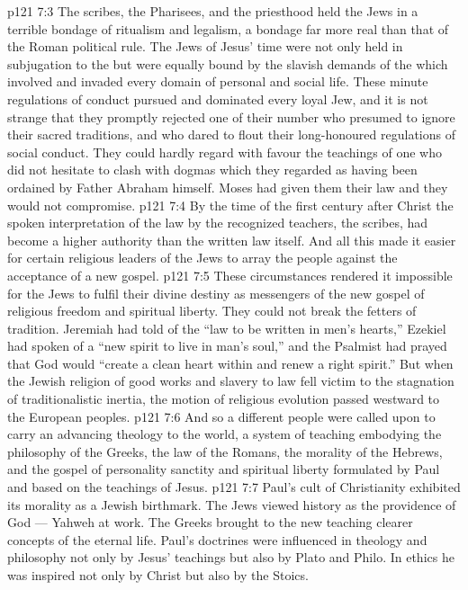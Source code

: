 \vs p121 7:3 The scribes, the Pharisees, and the priesthood held the Jews in a terrible bondage of ritualism and legalism, a bondage far more real than that of the Roman political rule. The Jews of Jesus’ time were not only held in subjugation to the  but were equally bound by the slavish demands of the  which involved and invaded every domain of personal and social life. These minute regulations of conduct pursued and dominated every loyal Jew, and it is not strange that they promptly rejected one of their number who presumed to ignore their sacred traditions, and who dared to flout their long\hyp{}honoured regulations of social conduct. They could hardly regard with favour the teachings of one who did not hesitate to clash with dogmas which they regarded as having been ordained by Father Abraham himself. Moses had given them their law and they would not compromise.
\vs p121 7:4 By the time of the first century after Christ the spoken interpretation of the law by the recognized teachers, the scribes, had become a higher authority than the written law itself. And all this made it easier for certain religious leaders of the Jews to array the people against the acceptance of a new gospel.
\vs p121 7:5 These circumstances rendered it impossible for the Jews to fulfil their divine destiny as messengers of the new gospel of religious freedom and spiritual liberty. They could not break the fetters of tradition. Jeremiah had told of the “law to be written in men’s hearts,” Ezekiel had spoken of a “new spirit to live in man’s soul,” and the Psalmist had prayed that God would “create a clean heart within and renew a right spirit.” But when the Jewish religion of good works and slavery to law fell victim to the stagnation of traditionalistic inertia, the motion of religious evolution passed westward to the European peoples.
\vs p121 7:6 And so a different people were called upon to carry an advancing theology to the world, a system of teaching embodying the philosophy of the Greeks, the law of the Romans, the morality of the Hebrews, and the gospel of personality sanctity and spiritual liberty formulated by Paul and based on the teachings of Jesus.
\vs p121 7:7 \pc Paul’s cult of Christianity exhibited its morality as a Jewish birthmark. The Jews viewed history as the providence of God --- Yahweh at work. The Greeks brought to the new teaching clearer concepts of the eternal life. Paul’s doctrines were influenced in theology and philosophy not only by Jesus’ teachings but also by Plato and Philo. In ethics he was inspired not only by Christ but also by the Stoics.
